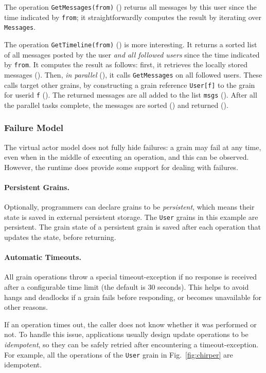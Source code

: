 The operation \lstinline|GetMessages(from)| () returns all messages by this user since the time indicated by \lstinline|from|; it straightforwardly computes the result by iterating over \lstinline{Messages}.  

The operation  \lstinline|GetTimeline(from)|  () is more interesting. It returns a sorted list of all messages posted by the user \emph{and all followed users} since  the time indicated by \lstinline|from|. It computes the result as follows: first, it retrieves the locally stored messages (). Then, \emph{in parallel} (), it calls \lstinline|GetMessages| on all followed users. These calls target other grains, by constructing a grain reference \lstinline|User[f]| to the grain for userid \lstinline|f| (). The returned messages are all added to the list \lstinline|msgs| (). After all the parallel tasks complete, the messages are sorted () and returned ().

\subsubsection{Failure Model}

The virtual actor model does not fully hide failures: a grain may fail at any time, even when in the middle of executing an operation, and this can be observed. However, the runtime does provide some support for dealing with failures.

\paragraph{Persistent Grains.} Optionally, programmers can declare grains to be \emph{persistent}, which means their state is saved in external persistent storage. The \lstinline|User| grains in this example are persistent. The grain state of a persistent grain is saved after each operation that updates the state, before returning.

\paragraph{Automatic Timeouts.} All grain operations throw a special timeout-exception if no response is received after a configurable time limit (the default is 30 seconds). This helps to avoid hangs and deadlocks if a grain fails before responding, or becomes unavailable for other reasons.

If an operation times out, the caller does not know whether it was performed or not. To handle this issue, applications usually design update operations to be \emph{idempotent}, so they can be safely retried after encountering a timeout-exception. For example, all the operations of the \lstinline|User| grain in Fig.~\ref{fig:chirper} are idempotent.

